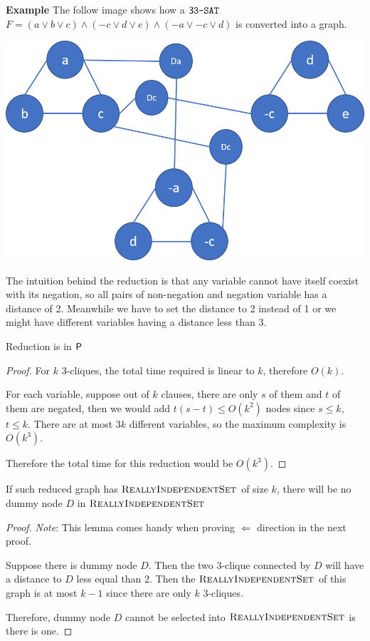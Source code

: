 \textbf{Example} The follow image shows how a $\tSAT$ $F = (a \vee b \vee c) \wedge (-c \vee d \vee e) \wedge (-a\vee -c \vee d)$ is converted into a graph.

\includegraphics[width = \textwidth]{Ex1.png}

The intuition behind the reduction is that any variable cannot have itself coexist with its negation, so all pairs of non-negation and negation variable has a distance of 2. 
Meanwhile we have to set the distance to 2 instead of 1 or we might have different variables having a distance less than 3.

\begin{theorem}
    Reduction is in $\P$
\end{theorem}

\begin{proof}
    For $k$ 3-cliques, the total time required is linear to $k$, therefore $O(k)$.

    For each variable, suppose out of $k$ clauses, there are only $s$ of them and $t$ of them are negated, then we would add $t(s-t) \leq O(k^2)$ nodes since $s \leq k$, $t \leq k$. 
    There are at most $3k$ different variables, so the maximum complexity is $O(k^3)$.

    Therefore the total time for this reduction would be $O(k^3)$.
\end{proof}

\begin{lemma}
    If such reduced graph has $\RIS$ of size $k$, there will be no dummy node $D$ in $\RIS$
\end{lemma}

\begin{proof}
    \textit{Note}: This lemma comes handy when proving $\Leftarrow$ direction in the next proof. 

    Suppose there is dummy node $D$. 
    Then the two 3-clique connected by $D$ will have a distance to $D$ less equal than 2. 
    Then the $\RIS$ of this graph is at most $k-1$ since there are only $k$ 3-cliques.

    Therefore, dummy node $D$ cannot be selected into $\RIS$ is there is one.
\end{proof}


